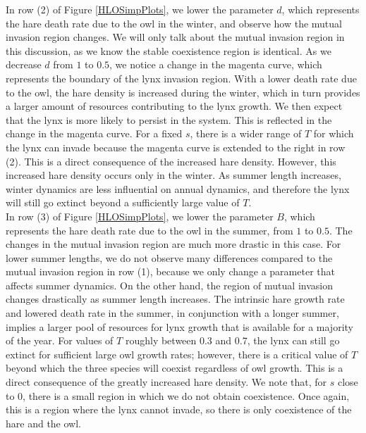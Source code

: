 \documentclass[12pt]{UOthesis}
\theoremstyle{remarkstyle}
\begin{document}
In row (2) of Figure \ref{HLOSimpPlots}, we lower the parameter $d$, which represents the hare death rate due to the owl in the winter, and observe how the mutual invasion region changes. We will only talk about the mutual invasion region in this discussion, as we know the stable coexistence region is identical. As we decrease $d$ from $1$ to $0.5$, we notice a change in the magenta curve, which represents the boundary of the lynx invasion region. With a lower death rate due to the owl, the hare density is increased during the winter, which in turn provides a larger amount of resources contributing to the lynx growth. We then expect that the lynx is more likely to persist in the system. This is reflected in the change in the magenta curve. For a fixed $s$, there is a wider range of $T$ for which the lynx can invade because the magenta curve is extended to the right in row (2). This is a direct consequence of the increased hare density. However, this increased hare density occurs only in the winter. As summer length increases, winter dynamics are less influential on annual dynamics, and therefore the lynx will still go extinct beyond a sufficiently large value of $T$.\\

In row (3) of Figure \ref{HLOSimpPlots}, we lower the parameter $B$, which represents the hare death rate due to the owl in the summer, from $1$ to $0.5$. The changes in the mutual invasion region are much more drastic in this case. For lower summer lengths, we do not observe many differences compared to the mutual invasion region in row (1), because we only change a parameter that affects summer dynamics. On the other hand, the region of mutual invasion changes drastically as summer length increases. The intrinsic hare growth rate and lowered death rate in the summer, in conjunction with a longer summer, implies a larger pool of resources for lynx growth that is available for a majority of the year. For values of $T$ roughly between 0.3 and 0.7, the lynx can still go extinct for sufficient large owl growth rates; however, there is a critical value of $T$ beyond which the three species will coexist regardless of owl growth. This is a direct consequence of the greatly increased hare density. We note that, for $s$ close to 0, there is a small region in which we do not obtain coexistence. Once again, this is a region where the lynx cannot invade, so there is only coexistence of the hare and the owl.\\
\end{document}
